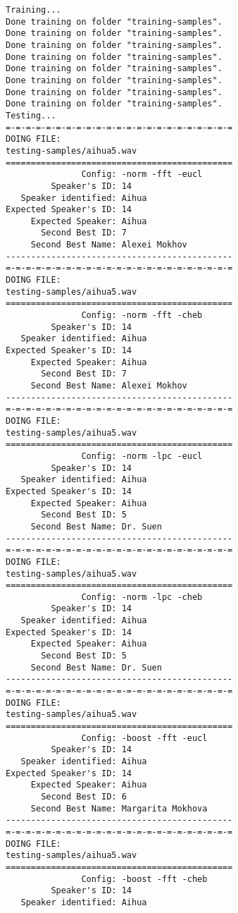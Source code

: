 \tiny
\begin{verbatim}
Training...
Done training on folder "training-samples".
Done training on folder "training-samples".
Done training on folder "training-samples".
Done training on folder "training-samples".
Done training on folder "training-samples".
Done training on folder "training-samples".
Done training on folder "training-samples".
Done training on folder "training-samples".
Testing...
=-=-=-=-=-=-=-=-=-=-=-=-=-=-=-=-=-=-=-=-=-=-=
DOING FILE:
testing-samples/aihua5.wav
=============================================
               Config: -norm -fft -eucl
         Speaker's ID: 14
   Speaker identified: Aihua
Expected Speaker's ID: 14
     Expected Speaker: Aihua
       Second Best ID: 7
     Second Best Name: Alexei Mokhov
---------------------------------------------
=-=-=-=-=-=-=-=-=-=-=-=-=-=-=-=-=-=-=-=-=-=-=
DOING FILE:
testing-samples/aihua5.wav
=============================================
               Config: -norm -fft -cheb
         Speaker's ID: 14
   Speaker identified: Aihua
Expected Speaker's ID: 14
     Expected Speaker: Aihua
       Second Best ID: 7
     Second Best Name: Alexei Mokhov
---------------------------------------------
=-=-=-=-=-=-=-=-=-=-=-=-=-=-=-=-=-=-=-=-=-=-=
DOING FILE:
testing-samples/aihua5.wav
=============================================
               Config: -norm -lpc -eucl
         Speaker's ID: 14
   Speaker identified: Aihua
Expected Speaker's ID: 14
     Expected Speaker: Aihua
       Second Best ID: 5
     Second Best Name: Dr. Suen
---------------------------------------------
=-=-=-=-=-=-=-=-=-=-=-=-=-=-=-=-=-=-=-=-=-=-=
DOING FILE:
testing-samples/aihua5.wav
=============================================
               Config: -norm -lpc -cheb
         Speaker's ID: 14
   Speaker identified: Aihua
Expected Speaker's ID: 14
     Expected Speaker: Aihua
       Second Best ID: 5
     Second Best Name: Dr. Suen
---------------------------------------------
=-=-=-=-=-=-=-=-=-=-=-=-=-=-=-=-=-=-=-=-=-=-=
DOING FILE:
testing-samples/aihua5.wav
=============================================
               Config: -boost -fft -eucl
         Speaker's ID: 14
   Speaker identified: Aihua
Expected Speaker's ID: 14
     Expected Speaker: Aihua
       Second Best ID: 6
     Second Best Name: Margarita Mokhova
---------------------------------------------
=-=-=-=-=-=-=-=-=-=-=-=-=-=-=-=-=-=-=-=-=-=-=
DOING FILE:
testing-samples/aihua5.wav
=============================================
               Config: -boost -fft -cheb
         Speaker's ID: 14
   Speaker identified: Aihua

\end{verbatim}
